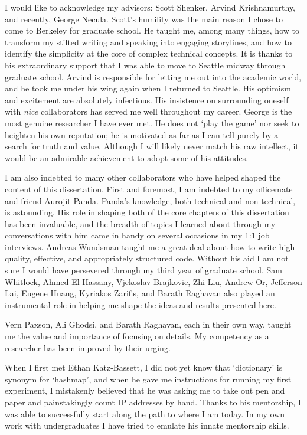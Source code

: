 \begin{acknowledgements}

I would like to acknowledge my advisors: Scott Shenker, Arvind
Krishnamurthy, and recently, George Necula. Scott's humility was the main reason I chose to
come to Berkeley for graduate school. He taught me, among many things, how to
transform my stilted writing and speaking into engaging storylines,
and how to identify the simplicity at the core of complex technical
concepts. It is thanks to his extraordinary support that I was able to move to Seattle midway through
graduate school. Arvind is responsible for
letting me out into the academic world, and he took me under his wing again
when I returned to Seattle. His optimism and
excitement are absolutely infectious. His insistence on
surrounding
oneself with \textit{nice} collaborators has served me well throughout my
career. George is the most genuine researcher I have ever met. He does
not `play the game' nor seek to heighten his own reputation; he is motivated
as far as I can tell purely by a search for truth and value. Although I
will likely never match his raw intellect, it would be an admirable
achievement to adopt some of his attitudes.

I am also indebted to many other collaborators who have helped shaped the
content of this dissertation. First and foremost, I am indebted to my
officemate and friend Aurojit Panda. Panda's knowledge, both technical and non-technical,
is astounding. His role in shaping both of the core chapters of this
dissertation has been invaluable, and the breadth of
topics I learned about through my conversations with
him came in handy on several occasions in my 1:1 job interviews. Andreas Wundsman taught me a great deal about
how to write high quality, effective, and appropriately structured code.
Without his aid I am not sure I
would have persevered through my third year of graduate school. Sam Whitlock,
Ahmed El-Hassany, Vjekoslav Brajkovic, Zhi Liu, Andrew Or, Jefferson Lai,
Eugene Huang, Kyriakos Zarifis, and Barath Raghavan also played an
instrumental role in helping me shape the ideas and results presented here.

Vern Paxson, Ali Ghodsi, and Barath Raghavan, each in their own way, taught me
the value and importance of focusing on details. My competency as a researcher
has been improved by their urging.

When I first met Ethan Katz-Bassett, I did not yet know that `dictionary' is
synonym for `hashmap', and when he gave me instructions for running my first experiment,
I mistakenly believed that he was asking me to take
out pen and paper and painstakingly count IP addresses by hand. Thanks to his
mentorship, I was able to successfully start along the path to where I am today.
In my own work with undergraduates I have tried to emulate his innate
mentorship skills.


\end{acknowledgements}
